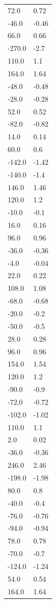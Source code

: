\begin{longtable}{ll}
72.0 & 0.72 \\
-46.0 & -0.46 \\
66.0 & 0.66 \\
-270.0 & -2.7 \\
110.0 & 1.1 \\
164.0 & 1.64 \\
-48.0 & -0.48 \\
-28.0 & -0.28 \\
52.0 & 0.52 \\
-82.0 & -0.82 \\
14.0 & 0.14 \\
60.0 & 0.6 \\
-142.0 & -1.42 \\
-140.0 & -1.4 \\
146.0 & 1.46 \\
120.0 & 1.2 \\
-10.0 & -0.1 \\
16.0 & 0.16 \\
96.0 & 0.96 \\
-36.0 & -0.36 \\
-4.0 & -0.04 \\
22.0 & 0.22 \\
108.0 & 1.08 \\
-68.0 & -0.68 \\
-20.0 & -0.2 \\
-50.0 & -0.5 \\
28.0 & 0.28 \\
96.0 & 0.96 \\
154.0 & 1.54 \\
120.0 & 1.2 \\
-90.0 & -0.9 \\
-72.0 & -0.72 \\
-102.0 & -1.02 \\
110.0 & 1.1 \\
2.0 & 0.02 \\
-36.0 & -0.36 \\
246.0 & 2.46 \\
-198.0 & -1.98 \\
80.0 & 0.8 \\
-40.0 & -0.4 \\
-76.0 & -0.76 \\
-94.0 & -0.94 \\
78.0 & 0.78 \\
-70.0 & -0.7 \\
-124.0 & -1.24 \\
54.0 & 0.54 \\
164.0 & 1.64 \\

\end{longtable}

